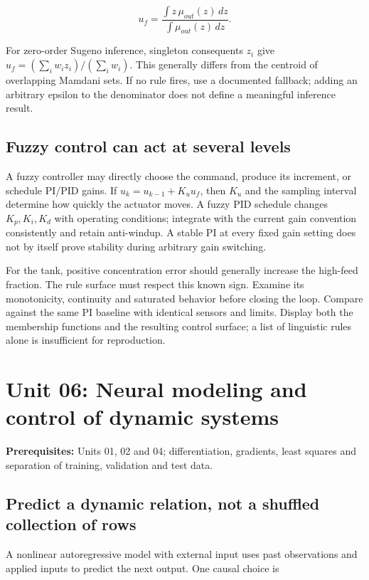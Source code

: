 \documentclass[11pt,a4paper]{article}
\begin{document}
\[u_f=\frac{\int z\,\mu_{out}(z)\,dz}{\int\mu_{out}(z)\,dz}.\]

For zero-order Sugeno inference, singleton consequents $z_i$ give $u_f=(\sum_i w_i z_i)/(\sum_i w_i)$. This generally differs from the centroid of overlapping Mamdani sets. If no rule fires, use a documented fallback; adding an arbitrary epsilon to the denominator does not define a meaningful inference result.


\subsection{Fuzzy control can act at several levels}

A fuzzy controller may directly choose the command, produce its increment, or schedule PI/PID gains. If $u_k=u_{k-1}+K_u u_f$, then $K_u$ and the sampling interval determine how quickly the actuator moves. A fuzzy PID schedule changes $K_p,K_i,K_d$ with operating conditions; integrate with the current gain convention consistently and retain anti-windup. A stable PI at every fixed gain setting does not by itself prove stability during arbitrary gain switching.


For the tank, positive concentration error should generally increase the high-feed fraction. The rule surface must respect this known sign. Examine its monotonicity, continuity and saturated behavior before closing the loop. Compare against the same PI baseline with identical sensors and limits. Display both the membership functions and the resulting control surface; a list of linguistic rules alone is insufficient for reproduction.

\clearpage\section{Unit 06: Neural modeling and control of dynamic systems}
\textbf{Prerequisites:} Units 01, 02 and 04; differentiation, gradients, least squares and separation of training, validation and test data.


\subsection{Predict a dynamic relation, not a shuffled collection of rows}

A nonlinear autoregressive model with external input uses past observations and applied inputs to predict the next output. One causal choice is
\end{document}
